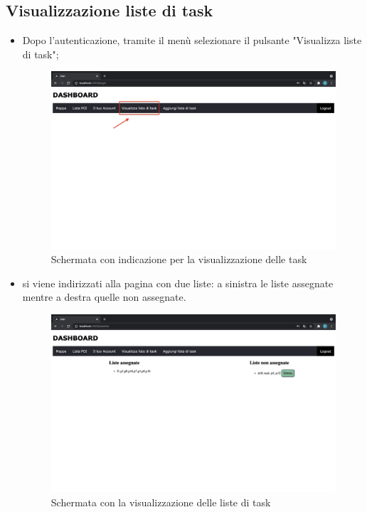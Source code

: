 \subsection{Visualizzazione liste di task}
\begin{itemize}
    \item Dopo l'autenticazione, tramite il menù selezionare il pulsante "Visualizza liste di task";
    \begin{figure}[H]
        \centering
        \includegraphics[scale=0.2]{res/images/dashboard8.png}
        \caption{Schermata con indicazione per la visualizzazione delle task}
    \end{figure}
    \item si viene indirizzati alla pagina con due liste: a sinistra le liste assegnate mentre a destra quelle non assegnate.
    \begin{figure}[H]
        \centering
        \includegraphics[scale=0.2]{res/images/tasklist.png}
        \caption{Schermata con la visualizzazione delle liste di task}

\end{figure}
\end{itemize}
